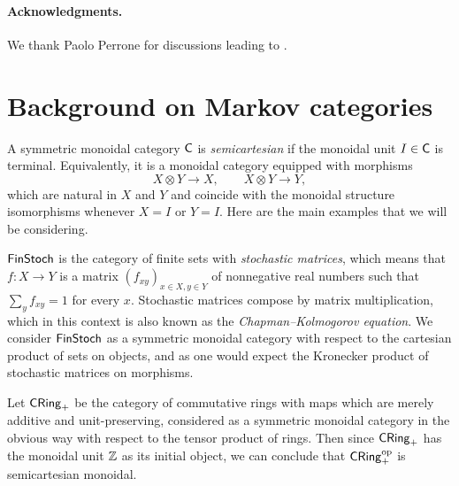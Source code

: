 \documentclass[11pt]{article}
\begin{document}
\paragraph*{Acknowledgments.} We thank Paolo Perrone for discussions leading to .

\section{Background on Markov categories}\label{background}

A symmetric monoidal category $\mathsf{C}$ is \emph{semicartesian} if the monoidal unit $I \in \mathsf{C}$ is terminal. Equivalently, it is a monoidal category equipped with morphisms
\[
	X \otimes Y \longrightarrow X, \qquad X \otimes Y \longrightarrow Y,
\]
which are natural in $X$ and $Y$ and coincide with the monoidal structure isomorphisms whenever $X = I$ or $Y = I$. Here are the main examples that we will be considering.

\begin{example}
	\label{finstoch}
	$\operatorname{\mathsf{FinStoch}}$ is the category of finite sets with \emph{stochastic matrices}, which means that $f : X \to Y$ is a matrix $(f_{xy})_{x \in X,y \in Y}$ of nonnegative real numbers such that $\sum_y f_{xy} = 1$ for every $x$. Stochastic matrices compose by matrix multiplication, which in this context is also known as the \emph{Chapman--Kolmogorov equation}. We consider $\operatorname{\mathsf{FinStoch}}$ as a symmetric monoidal category with respect to the cartesian product of sets on objects, and as one would expect the Kronecker product of stochastic matrices on morphisms.
\end{example}

\begin{example}
	\label{cring}
	Let $\operatorname{\mathsf{CRing}}_+$ be the category of commutative rings with maps which are merely additive and unit-preserving, considered as a symmetric monoidal category in the obvious way with respect to the tensor product of rings. Then since $\operatorname{\mathsf{CRing}}_+$ has the monoidal unit $\mathbb{Z}$ as its initial object, we can conclude that $\operatorname{\mathsf{CRing}}_+^{\mathrm{op}}$ is semicartesian monoidal.
\end{example}
\end{document}
